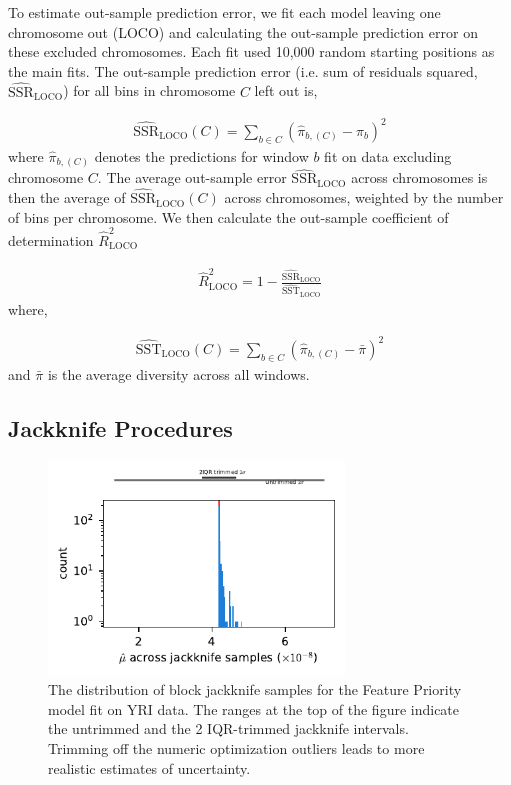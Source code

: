 \documentclass[11pt]{article}
\begin{document}
To estimate out-sample prediction error, we fit each model leaving one
chromosome out (LOCO) and calculating the out-sample prediction error on
these excluded chromosomes. Each fit used 10,000 random starting positions as
the main fits. The out-sample prediction error (i.e. sum of residuals
squared, $\widehat{\mathrm{SSR}}_\text{LOCO}$) for all bins in chromosome $C$
left out is,

\begin{align}
    \widehat{\mathrm{SSR}}_\text{LOCO}(C) = \sum_{b \in C} (\widehat{\pi}_{b, (C)}  - \pi_b)^2
\end{align}
%
where $\widehat{\pi}_{b,(C)}$ denotes the predictions for window $b$ fit on
data excluding chromosome $C$. The average out-sample error
$\widehat{\mathrm{SSR}}_\text{LOCO}$ across chromosomes is then the average of
$\widehat{\mathrm{SSR}}_\text{LOCO}(C)$ across chromosomes, weighted by the
number of bins per chromosome. We then calculate the out-sample coefficient of
determination $\widehat{R}_\text{LOCO}^2$

\begin{align}
    \widehat{R}_\text{LOCO}^2 = 1-\frac{\widehat{\mathrm{SSR}}_\text{LOCO}}{\widehat{\mathrm{SST}}_\text{LOCO}}
\end{align}
%
where, 

\begin{align}
    \widehat{\mathrm{SST}}_\text{LOCO}(C) = \sum_{b \in C} (\widehat{\pi}_{b, (C)}  - \bar{\pi})^2
\end{align}
%
and $\bar{\pi}$ is the average diversity across all windows.

\subsection{Jackknife Procedures}
\label{supp:jackknife}

\begin{figure}[htbp]
  \label{suppfig:jackknife-iqr}
  \centering
  \includegraphics[width=0.7\textwidth]{figures/supplementary/iqr_jackknife_trim.pdf}

  \caption{The distribution of block jackknife samples for the Feature Priority
  model fit on YRI data. The ranges at the top of the figure indicate the
untrimmed and the 2 IQR-trimmed jackknife intervals. Trimming off the numeric
optimization outliers leads to more realistic estimates of uncertainty.}

\end{figure}
\end{document}
